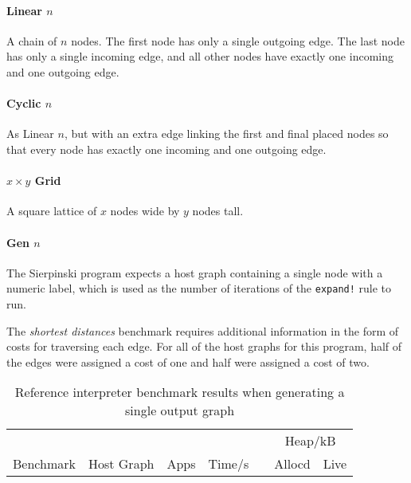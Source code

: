 \paragraph*{Linear $n$}

A chain of $n$ nodes. The first node has only a single outgoing edge. The last node has only a single incoming edge, and all other nodes have exactly one incoming and one outgoing edge.

\paragraph*{Cyclic $n$}

As Linear $n$, but with an extra edge linking the first and final placed nodes so that every node has exactly one incoming and one outgoing edge.

\paragraph*{$x \times y$ Grid}

A square lattice of $x$ nodes wide by $y$ nodes tall.

\paragraph*{Gen $n$}

The Sierpinski program expects a host graph containing a single node with a numeric label, which is used as the number of iterations of the \texttt{expand!} rule to run.


The \textit{shortest distances} benchmark requires additional information in the form of costs for traversing each edge. For all of the host graphs for this program, half of the edges were assigned a cost of one and half were assigned a cost of two.




\begin{table}[h]
\begin{minipage}{\textwidth}
\centering

\begin{tabular}{llrrcrr}
\hline 
&  & & & & \multicolumn{2}{c}{Heap/kB}\\
Benchmark          & Host Graph\footnotemark & Apps & Time/s   & & Allocd & Live \\
\hline 

\end{tabular}

\caption[Reference interpreter benchmarks]{Reference interpreter benchmark results when generating a single output graph}

\label{table:resultsSingle}
\end{minipage}
\end{table}



